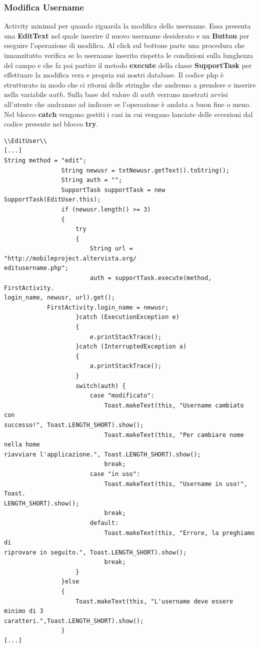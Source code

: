 \documentclass[a4paper, 50pt, twoside]{article}
\begin{document}
\subsubsection{Modifica Username}
Activity minimal per quando riguarda la modifica dello username. Essa presenta una \textbf{EditText} nel quale inserire il nuovo username desiderato e un \textbf{Button} per eseguire l’operazione di modifica. Al click sul bottone parte una procedura che innanzitutto verifica se lo username inserito rispetta le condizioni sulla lunghezza del campo e che fa poi partire il metodo \textbf{execute} della classe \textbf{SupportTask} per effettuare la modifica vera e propria sui nostri database. Il codice php è strutturato in modo che ci ritorni delle stringhe che andremo a prendere e inserire nella variabile $auth$. Sulla base del valore di $auth$ verrano mostrati avvisi all’utente che andranno ad indicare se l’operazione è andata a buon fine o meno. Nel blocco \textbf{catch} vengono gestiti i casi in cui vengano lanciate delle eccezioni dal codice presente nel blocco \textbf{try}.
\begin{lstlisting}
\\EditUser\\
[...]
String method = "edit";
                String newusr = txtNewusr.getText().toString();
                String auth = "";
                SupportTask supportTask = new SupportTask(EditUser.this);
                if (newusr.length() >= 3)
                {
                    try
                    {
                        String url = "http://mobileproject.altervista.org/
editusername.php";
                        auth = supportTask.execute(method, FirstActivity.
login_name, newusr, url).get();
			FirstActivity.login_name = newusr;
                    }catch (ExecutionException e)
                    {
                        e.printStackTrace();
                    }catch (InterruptedException a)
                    {
                        a.printStackTrace();
                    }
                    switch(auth) {
                        case "modificato":
                            Toast.makeText(this, "Username cambiato con 
successo!", Toast.LENGTH_SHORT).show();
                            Toast.makeText(this, "Per cambiare nome nella home 
riavviare l'applicazione.", Toast.LENGTH_SHORT).show();
                            break;
                        case "in uso":
                            Toast.makeText(this, "Username in uso!", Toast.
LENGTH_SHORT).show();
                            break;
                        default:
                            Toast.makeText(this, "Errore, la preghiamo di 
riprovare in seguito.", Toast.LENGTH_SHORT).show();
                            break;
                    }
                }else
                {
                    Toast.makeText(this, "L'username deve essere minimo di 3 
caratteri.",Toast.LENGTH_SHORT).show();
                }
[...]
\end{lstlisting}
\end{document}
